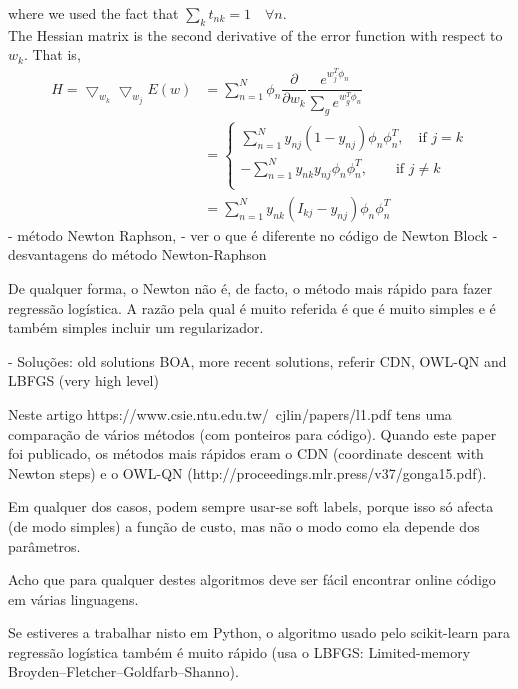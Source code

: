 \documentclass{article}
\begin{document}
where we used the fact that $\sum_{k} t_{nk}=1 \quad \forall n$. \\ \noindent
The Hessian matrix is the second derivative of the error function with respect to $w_k$. That is,
\begin{equation}
\begin{split}
    H =\bigtriangledown_{w_k} \bigtriangledown_{w_j} E(w) &= \sum_{n=1}^N \phi_n \dfrac{\partial}{\partial w_k} \dfrac{e^{w_j^T\phi_n}}{\sum_g e^{w_g^T\phi_n}}\\
    &=  \left\{
                \begin{array}{ll}
                  \sum_{n=1}^N y_{nj}(1-y_{nj})\phi_n \phi_n^T, \quad \text{if $j=k$}\\
                  -\sum_{n=1}^N  y_{nk}y_{nj}\phi_n \phi_n^T, \qquad \text{if $j \neq k$}\\
                \end{array}
              \right.\\
        &= \sum_{n=1}^N y_{nk}(I_{kj}-y_{nj})\phi_n \phi_n^T
        \end{split}
\end{equation}
- método Newton Raphson, 
- ver o que é diferente no código de Newton Block
- desvantagens do método Newton-Raphson

De qualquer forma, o Newton não é, de facto, o método mais rápido para
fazer regressão logística. A razão pela qual é muito referida é que é
muito simples e é também simples incluir um regularizador.

- Soluções: old solutions BOA, more recent solutions, referir CDN, OWL-QN and LBFGS (very high level)

Neste artigo https://www.csie.ntu.edu.tw/~cjlin/papers/l1.pdf tens uma
comparação de vários métodos (com ponteiros para código). Quando este
paper foi publicado, os métodos mais rápidos eram o CDN (coordinate
descent with Newton steps) e o OWL-QN
(http://proceedings.mlr.press/v37/gonga15.pdf).

Em qualquer dos casos, podem sempre usar-se soft labels, porque isso
só afecta (de modo simples) a função de custo, mas não o modo como ela
depende dos parâmetros.

Acho que para qualquer destes algoritmos deve ser fácil encontrar
online código em várias linguagens.

Se estiveres a trabalhar nisto em Python, o algoritmo usado pelo
scikit-learn para regressão logística também é muito rápido (usa o
LBFGS: Limited-memory Broyden–Fletcher–Goldfarb–Shanno).
\end{document}
